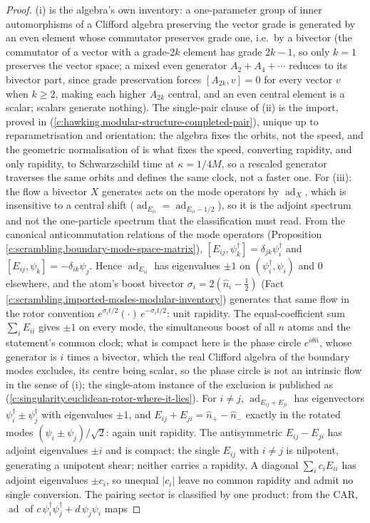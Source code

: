\documentclass[11pt]{article}
\theoremstyle{definition}
\theoremstyle{plain}
\begin{document}
\begin{proof}
(i) is the algebra's own inventory: a one-parameter group of inner automorphisms of a Clifford algebra preserving the vector grade is generated by an even element whose commutator preserves grade one, i.e.\ by a bivector (the commutator of a vector with a grade-$2k$ element has grade $2k - 1$, so only $k = 1$ preserves the vector space; a mixed even generator $A_2 + A_4 + \cdots$ reduces to its bivector part, since grade preservation forces $[A_{2k}, v] = 0$ for every vector $v$ when $k \geq 2$, making each higher $A_{2k}$ central, and an even central element is a scalar; scalars generate nothing). The single-pair clause of (ii) is the import, proved in \cite[Prop.~2.1]{ButlerT7} (\ref{c:hawking.modular-structure-completed-pair}), unique up to reparametrisation and orientation: the algebra fixes the orbits, not the speed, and the geometric normalisation of \cite[App.~A]{ButlerT5} is what fixes the speed, converting rapidity, and only rapidity, to Schwarzschild time at $\kappa = 1/4M$, so a rescaled generator traverses the same orbits and defines the same clock, not a faster one. For (iii): the flow a bivector $X$ generates acts on the mode operators by $\operatorname{ad}_X$, which is insensitive to a central shift ($\operatorname{ad}_{E_{ii}} = \operatorname{ad}_{E_{ii} - 1/2}$), so it is the adjoint spectrum and not the one-particle spectrum that the classification must read. From the canonical anticommutation relations of the mode operators (Proposition \ref{c:scrambling.boundary-mode-space-matrix}), $[E_{ij}, \psi_k^\dagger] = \delta_{jk}\psi_i^\dagger$ and $[E_{ij}, \psi_k] = -\delta_{ik}\psi_j$. Hence $\operatorname{ad}_{E_{ii}}$ has eigenvalues $\pm 1$ on $(\psi_i^\dagger, \psi_i)$ and $0$ elsewhere, and the atom's boost bivector $\sigma_i = 2(\hat n_i - \tfrac12)$ (Fact \ref{c:scrambling.imported-modes-modular-inventory}) generates that same flow in the rotor convention $e^{\sigma_i t/2}(\cdot)\,e^{-\sigma_i t/2}$: unit rapidity. The equal-coefficient sum $\sum_i E_{ii}$ gives $\pm 1$ on every mode, the simultaneous boost of all $n$ atoms and the statement's common clock; what is compact here is the phase circle $e^{i\theta \hat n}$, whose generator is $i$ times a bivector, which the real Clifford algebra of the boundary modes excludes, its centre being scalar, so the phase circle is not an intrinsic flow in the sense of (i); the single-atom instance of the exclusion is published as \cite[Prop.~7.21(3)]{ButlerT5} (\ref{c:singularity.euclidean-rotor-where-it-lies}). For $i \neq j$, $\operatorname{ad}_{E_{ij} + E_{ji}}$ has eigenvectors $\psi_i^\dagger \pm \psi_j^\dagger$ with eigenvalues $\pm 1$, and $E_{ij} + E_{ji} = \hat n_+ - \hat n_-$ exactly in the rotated modes $(\psi_i \pm \psi_j)/\sqrt{2}$: again unit rapidity. The antisymmetric $E_{ij} - E_{ji}$ has adjoint eigenvalues $\pm i$ and is compact; the single $E_{ij}$ with $i \neq j$ is nilpotent, generating a unipotent shear; neither carries a rapidity. A diagonal $\sum_i c_i E_{ii}$ has adjoint eigenvalues $\pm c_i$, so unequal $|c_i|$ leave no common rapidity and admit no single conversion. The pairing sector is classified by one product: from the CAR, $\operatorname{ad}$ of $c\,\psi_i^\dagger\psi_j^\dagger + d\,\psi_j\psi_i$ maps 
\end{proof}
\end{document}
